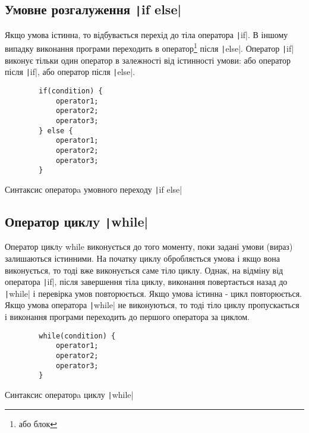 

\subsection[Умовний оператор \code{if else}]{Умовне розгалуження \texttt|if else|}
Якщо умова істинна, то відбувається перехід до тіла оператора \texttt|if|. В іншому випадку виконання програми переходить в оператор\footnote[1]{або блок} після \texttt|else|. Оператор \texttt|if| виконує тільки один оператор в залежності від істинності умови: або оператор після \texttt|if|, або оператор після \texttt|else|.
\begin{listing}[H]
	\begin{verbatim}
		if(condition) {
			operator1;
			operator2;
			operator3;
		} else {
			operator1;
			operator2;
			operator3;
		}
	\end{verbatim}
	\caption[Синтаксис ]{Синтаксис операторa умовного переходу \texttt|if else|}
	\label{lst:ifelseoperator}
\end{listing}

\subsection[Цикл \code{while}]{Оператор циклy \texttt|while|}
Оператор циклy while виконується до того моменту, поки задані умови (вираз) залишаються істинними. На початку циклу обробляється умова і якщо вона виконується, то тоді вже виконується саме тіло циклу. Однак, на відміну від оператора \texttt|if|, після завершення тіла циклу, виконання повертається назад до \texttt|while| і перевірка умов повторюється. Якщо умова істинна - цикл повторюється. Якщо умова оператора \texttt|while| не виконуються, то тоді тіло циклу пропускається і виконання програми переходить до першого оператора за циклом.
\begin{listing}[H]
	\begin{verbatim}
		while(condition) {
			operator1;
			operator2;
			operator3;
		}
	\end{verbatim}
	\caption[Синтаксис ]{Синтаксис операторa циклу \texttt|while|}
	\label{lst:whileloop}
\end{listing}

